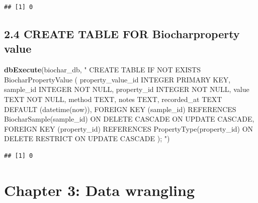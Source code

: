\documentclass[
]{article}
\newenvironment{Shaded}{\begin{snugshade}}{\end{snugshade}}
\newcommand{\FunctionTok}[1]{\textcolor[rgb]{0.13,0.29,0.53}{\textbf{#1}}}
\newcommand{\NormalTok}[1]{#1}
\newcommand{\StringTok}[1]{\textcolor[rgb]{0.31,0.60,0.02}{#1}}
\begin{document}
\begin{verbatim}
## [1] 0
\end{verbatim}

\subsection{2.4 CREATE TABLE FOR Biocharproperty
value}\label{create-table-for-biocharproperty-value}

\begin{Shaded}
\begin{Highlighting}[]
\FunctionTok{dbExecute}\NormalTok{(biochar\_db, }\StringTok{"}
\StringTok{CREATE TABLE IF NOT EXISTS BiocharPropertyValue (}
\StringTok{property\_value\_id INTEGER PRIMARY KEY,}
\StringTok{sample\_id         INTEGER NOT NULL,}
\StringTok{property\_id       INTEGER NOT NULL,}
\StringTok{value             TEXT    NOT NULL,}
\StringTok{method            TEXT,}
\StringTok{notes             TEXT,}
\StringTok{recorded\_at       TEXT DEFAULT (datetime(\textquotesingle{}now\textquotesingle{})),}
\StringTok{FOREIGN KEY (sample\_id)   REFERENCES BiocharSample(sample\_id) ON DELETE CASCADE ON UPDATE CASCADE,}
\StringTok{FOREIGN KEY (property\_id) REFERENCES PropertyType(property\_id) ON DELETE RESTRICT ON UPDATE CASCADE}
\StringTok{);}
\StringTok{"}\NormalTok{)}
\end{Highlighting}
\end{Shaded}

\begin{verbatim}
## [1] 0
\end{verbatim}

\section{Chapter 3: Data wrangling}\label{chapter-3-data-wrangling}
\end{document}
